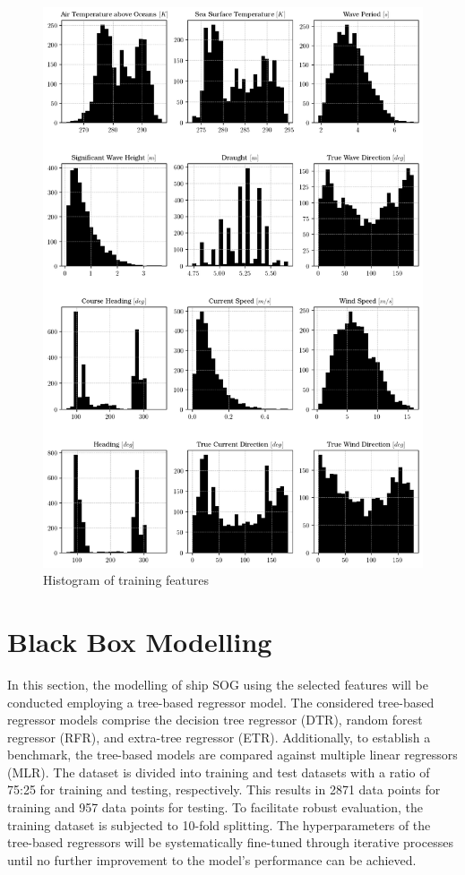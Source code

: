 \begin{figure}
    \centering
    \includegraphics[width=.9\linewidth]{02_figures/hist_init_preprocessing.png}
    \caption{Histogram of training features}
    \label{fig:hist_training_ftr_label}
\end{figure}

\section{Black Box Modelling}\label{sec:BBM_modelling}

In this section, the modelling of ship SOG using the selected features will be conducted employing a tree-based regressor model. The considered tree-based regressor models comprise the decision tree regressor (DTR), random forest regressor (RFR), and extra-tree regressor (ETR). Additionally, to establish a benchmark, the tree-based models are compared against multiple linear regressors (MLR). The dataset is divided into training and test datasets with a ratio of 75:25 for training and testing, respectively. This results in 2871 data points for training and 957 data points for testing. To facilitate robust evaluation, the training dataset is subjected to 10-fold splitting. The hyperparameters of the tree-based regressors will be systematically fine-tuned through iterative processes until no further improvement to the model's performance can be achieved.\\



